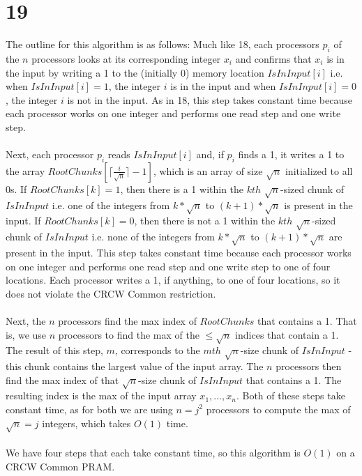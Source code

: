 \documentclass[letterpaper,notitlepage,twoside]{article}
\begin{document}
\section*{19}
The outline for this algorithm is as follows: Much like 18, each processors $p_i$ of the $n$ processors looks at its corresponding integer $x_i$ and confirms that $x_i$ is in the input by writing a 1 to the (initially 0) memory location $IsInInput[i]$ i.e. when $IsInInput[i] = 1$, the integer $i$ is in the input and when $IsInInput[i] = 0$, the integer $i$ is not in the input. As in 18, this step takes constant time because each processor works on one integer and performs one read step and one write step. \\\\
Next, each processor $p_i$ reads $IsInInput[i]$ and, if $p_i$ finds a 1, it writes a 1 to the array $RootChunks[\lceil \frac{i}{\sqrt{n}} \rceil -1]$, which is an array of size $\sqrt{n}$ initialized to all 0s. If $RootChunks[k] = 1$, then there is a 1 within the $kth$ $\sqrt{n}$-sized chunk of $IsInInput$ i.e. one of the integers from $k*\sqrt{n}$ to $(k+1)*\sqrt{n}$ is present in the input. If $RootChunks[k] = 0$, then there is not a 1 within the $kth$ $\sqrt{n}$-sized chunk of $IsInInput$ i.e. none of the integers from $k*\sqrt{n}$ to $(k+1)*\sqrt{n}$ are present in the input. This step takes constant time because each processor works on one integer and performs one read step and one write step to one of four locations. Each processor writes a 1, if anything, to one of four locations, so it does not violate the CRCW Common restriction. \\\\
Next, the $n$ processors find the max index of $RootChunks$ that contains a 1. That is, we use $n$ processors to find the max of the $\leq \sqrt{n}$ indices that contain a 1. The result of this step, $m$, corresponds to the $mth$ $\sqrt{n}$-size chunk of $IsInInput$ - this chunk contains the largest value of the input array. The $n$ processors then find the max index of that $\sqrt{n}$-size chunk of $IsInInput$ that contains a 1. The resulting index is the max of the input array $x_1, ..., x_n$. Both of these steps take constant time, as for both we are using $n = j^{2}$ processors to compute the max of $\sqrt{n} = j$ integers, which takes $O(1)$ time. \\\\
We have four steps that each take constant time, so this algorithm is $O(1)$ on a CRCW Common PRAM.
\end{document}

